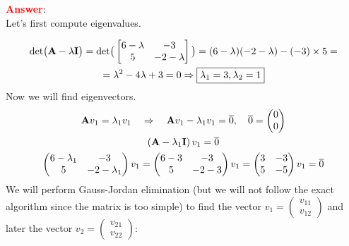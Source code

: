 \documentclass{homework}
\begin{document}
    \textbf{\textcolor{red}{Answer}}: \\
    Let's first compute eigenvalues.
    
    \begin{equation*}
    \begin{gathered}
        \text{det}\big(\text{\textbf{A}} - \lambda \textbf{I}\big) = 
        \text{det}\big(\left[
        \begin{matrix}
        6-\lambda & -3 \\
        5  & -2-\lambda
        \end{matrix}
        \right]\big) = (6-\lambda)(-2-\lambda) -(-3)\times5 = \\
        = \lambda^2 - 4\lambda + 3 = 0 \Rightarrow \boxed{\lambda_{1} = 3, \lambda_{2} = 1}
    \end{gathered}
    \end{equation*}
    Now we will find eigenvectors.
    \begin{equation*}
    \begin{gathered}
        \text{\textbf{A}}v_1 = \lambda_1 v_1 \quad \Rightarrow \quad \text{\textbf{A}}v_1 - \lambda_1 v_1 = \overline{0}, \quad \overline{0} = \left(\begin{matrix}
        0 \\
        0 \\
        \end{matrix}\right) \\
        \left(\text{\textbf{A}} - \lambda_1 \text{\textbf{I}}\right)v_1 = \overline{0} \\
        \left(\begin{matrix}
        6-\lambda_1 & -3 \\
        5  & -2-\lambda_1
        \end{matrix}\right)v_1 = 
        \left(\begin{matrix}
        6-3 & -3 \\
        5  & -2-3
        \end{matrix}\right)v_1 = 
        \left(\begin{matrix}
        3 & -3 \\
        5  & -5
        \end{matrix}\right)v_1 = \overline{0}
        \end{gathered}
    \end{equation*}
    We will perform Gauss-Jordan elimination (but we will not follow the exact algorithm since the matrix is too simple) to find the vector $v_1 = \left(\begin{matrix}
    v_{11} \\
    v_{12}
    \end{matrix}\right)$ and later the vector $v_2 = \left(\begin{matrix}
    v_{21} \\
    v_{22}
    \end{matrix}\right)$:
\end{document}
